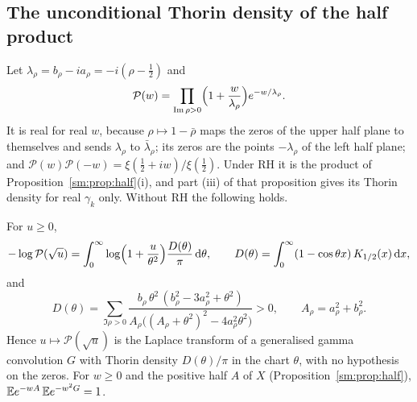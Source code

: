 \subsection{The unconditional Thorin density of the half product}

Let $\lambda_\rho=b_\rho-ia_\rho=-i(\rho-\frac12)$ and
\[
\mathcal P(w)=\prod_{\Im\rho>0}\Bigl(1+\frac w{\lambda_\rho}\Bigr)e^{-w/\lambda_\rho}.
\]
It is real for real $w$, because $\rho\mapsto1-\bar\rho$ maps the zeros of the upper half plane to themselves and sends $\lambda_\rho$ to $\bar\lambda_\rho$; its zeros are the points $-\lambda_\rho$ of the left half plane; and $\mathcal P(w)\mathcal P(-w)=\xi(\frac12+iw)/\xi(\frac12)$. Under RH it is the product of Proposition~\ref{sm:prop:half}(i), and part (iii) of that proposition gives its Thorin density for real $\gamma_k$ only. Without RH the following holds.

\begin{proposition}\label{p:prop:thorin}
For $u\ge0$,
\[
-\log\mathcal P(\sqrt u)=\int_0^\infty\log\Bigl(1+\frac u{\theta^2}\Bigr)\frac{D(\theta)}\pi\,\mathrm d\theta,\qquad D(\theta)=\int_0^\infty(1-\cos\theta x)\,K_{1/2}(x)\,\mathrm dx,
\]
and
\[
D(\theta)=\sum_{\Im\rho>0}\frac{b_\rho\,\theta^2\,(b_\rho^2-3a_\rho^2+\theta^2)}{A_\rho\bigl((A_\rho+\theta^2)^2-4a_\rho^2\theta^2\bigr)}>0,\qquad A_\rho=a_\rho^2+b_\rho^2 .
\]
Hence $u\mapsto\mathcal P(\sqrt u)$ is the Laplace transform of a generalised gamma convolution $G$ with Thorin density $D(\theta)/\pi$ in the chart $\theta$, with no hypothesis on the zeros. For $w\ge0$ and the positive half $A$ of $X$ (Proposition~\ref{sm:prop:half}), $\E e^{-wA}\,\E e^{-w^2G}=1$.
\end{proposition}


